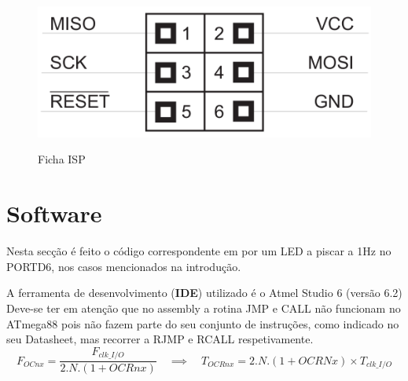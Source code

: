 \documentclass[titlepage, a4paper, 10pt, reqno, openany]{report}
\begin{document}
	\begin{figure}[H]
		\centering
		\includegraphics[scale=0.75]{./image/ISP_JTAG/isp_6pin.png}\\
		\caption{Ficha ISP}
	\end{figure}\par

	\section{Software}
	Nesta sec\c{c}\~{a}o \'{e} feito o c\'{o}digo correspondente em por um LED a piscar a 1Hz no PORTD6, nos casos mencionados na introdu\c{c}\~{a}o. \par
	A ferramenta de desenvolvimento ({\bf IDE}) utilizado \'{e} o Atmel Studio 6 (vers\~{a}o 6.2) \\
	Deve-se ter em aten\c{c}\~{a}o que no assembly a rotina JMP e CALL n\~{a}o funcionam no ATmega88 pois n\~{a}o fazem parte do seu conjunto de instru\c{c}\~{o}es, como indicado no seu Datasheet, mas recorrer a RJMP e RCALL respetivamente.	
	\begin{equation}
\boxed{F_{OCnx}=\frac{F_{clk\_I/O}}{2.N.(1+{OCRnx})}} \quad
\implies \quad {T_{OCRnx}=2.N.(1+OCRNx)\times T_{clk\_I/O}}
	\end{equation}
\end{document}
